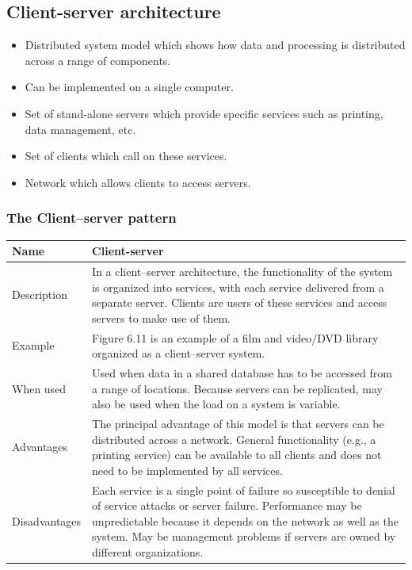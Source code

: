 \subsection{Client-server architecture}
\begin{itemize}

\item Distributed system model which shows how data and processing is distributed across a range of components.

 \item Can be implemented on a single computer.

\item Set of stand-alone servers which provide specific services such as printing, data management, etc.

\item Set of clients which call on these services. \item Network which allows clients to access servers.

\end{itemize}
\subsubsection{The Client–server pattern}

\begin{table}[h!]
\centering
\begin{tabular}{ |p{3cm}|p{8cm}|  }
\hline
Name & Client-server\\
\hline
\hline
Description & In a client–server architecture, the functionality of the system is organized into services, with each service delivered from a separate server. Clients are users of these services and access servers to make use of them.\\
\hline
Example & Figure 6.11 is an example of a film and video/DVD library organized as a client–server system.\\
\hline
When used & Used when data in a shared database has to be accessed from a range of locations. Because servers can be replicated, may also be used when the load on a system is variable.\\
\hline
Advantages & The principal advantage of this model is that servers can be distributed across a network. General functionality (e.g., a printing service) can be available to all clients and does not need to be implemented by all services.\\
\hline
Disadvantages & Each service is a single point of failure so susceptible to denial of service attacks or server failure. Performance may be unpredictable because it depends on the network as well as the system. May be management problems if servers are owned by different organizations.\\
\hline
\end{tabular}

\label{table:T2_3}
\end{table}
\newpage

